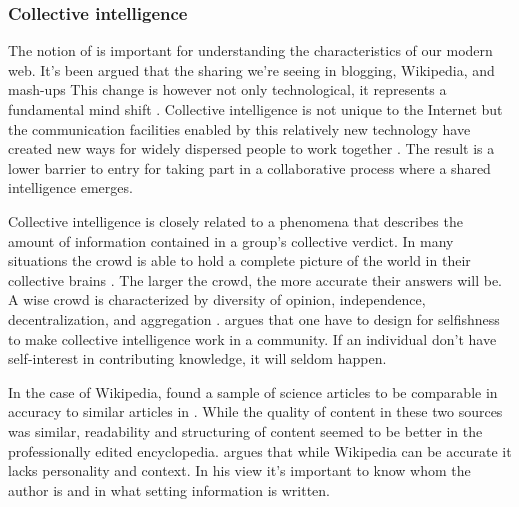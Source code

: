 \subsubsection{Collective intelligence}
The notion of  is important for understanding
the characteristics of our modern web. It's been argued that the sharing we're
seeing in blogging, Wikipedia,%
and mash-ups
This change is however not only technological, it represents a fundamental
mind shift \citep[]{kolbitsch06}.
Collective intelligence is not unique
to the Internet but the communication facilities enabled by this relatively
new technology have created new ways for widely dispersed people to work
together \citep{mitcenter08}. The result is a lower barrier to entry for
taking part in a collaborative process where a shared intelligence emerges.

Collective intelligence is closely related to
\dash{}a phenomena that describes the amount of
information contained in a group's collective verdict.
In many situations the crowd is able to hold a complete picture of the world
in their collective brains \citep[]{surowiecki04}. The larger the
crowd, the more accurate their answers will be.%
A wise crowd is characterized by diversity of opinion, independence,
decentralization, and aggregation \citep[]{surowiecki04}.
\citet{powazek08} argues that one have to design for selfishness to make
collective intelligence work in a community. If an individual don't have
self-interest in contributing knowledge, it will seldom happen.

In the case of Wikipedia, \citet{giles05} found a sample of science articles
to be comparable in accuracy to similar articles in
. While the quality of content in
these two sources was similar, readability and structuring of content seemed
to be better in the professionally edited encyclopedia.
\citet{lanier06} argues that while Wikipedia can be accurate it lacks
personality and context. In his view it's important to know whom the author is
and in what setting information is written.

